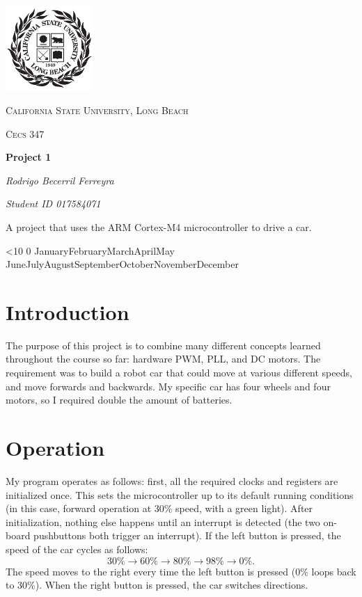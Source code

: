 \documentclass{article}
\renewcommand{\today}{\ifnum\number\day<10 0\fi \number\day \space%
\ifcase \month \or January\or February\or March\or April\or May%
\or June\or July\or August\or September\or October\or November\or December\fi\space%
\number \year}
\begin{document}
\begin{titlepage}
	\centering
	\includegraphics[width=0.25\textwidth]{Images/247px-CSU-Longbeach_seal}\par\vspace{1cm}
	{\scshape\Large California State University, Long Beach \par}
	\vspace{1cm}
	{\scshape\Large Cecs 347\par}
	\vspace{1.5cm}
	{\huge\bfseries Project 1\par}
	\vspace{2cm}
    {\Large\itshape Rodrigo Becerril Ferreyra\par}
    {\itshape\Large Student ID 017584071 \par}
	\vfill
    A project that uses the ARM Cortex-M4 microcontroller to
    drive a car.

	\vfill

	{\large \today\par}
\end{titlepage}

\section{Introduction}
The purpose of this project is to combine many different concepts
learned throughout the course so far: hardware PWM, PLL, and
DC motors. The requirement was to build a robot car that
could move at various different speeds, and move forwards and
backwards. My specific car has four wheels and four motors, so
I required double the amount of batteries.

\section{Operation}
My program operates as follows: first, all the required
clocks and registers are initialized once. This sets the
microcontroller up to its default running conditions (in this
case, forward operation at 30\% speed, with a green light).
After initialization, nothing else happens until an interrupt
is detected (the two on-board pushbuttons both trigger an
interrupt). If the left button is pressed, the speed of the
car cycles as follows:
\begin{equation*}
    30\% \rightarrow 60\% \rightarrow 80\% \rightarrow 98\% \rightarrow 0\%.
\end{equation*} The speed moves to the right every time the left
button is pressed (0\% loops back to 30\%). When the right button
is pressed, the car switches directions.
\end{document}
